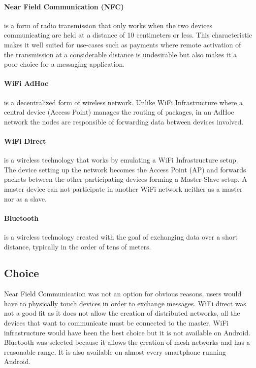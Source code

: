 \paragraph{Near Field Communication (NFC)}
is a form of radio transmission that only works when the two devices communicating are held at a distance of 10 centimeters or less. 
This characteristic makes it well suited for use-cases such as payments where remote activation of the transmission at a considerable distance is undesirable but also makes it a poor choice for a messaging application.

\paragraph{WiFi AdHoc} 
is a decentralized form of wireless network. Unlike WiFi Infrastructure where a central device (Access Point) manages the routing of packages, in an AdHoc network the nodes are responsible of forwarding data between devices involved.

\paragraph{WiFi Direct}
is a wireless technology that works by emulating a WiFi Infrastructure setup. The device setting up the network becomes the Access Point (AP) and forwards packets between the other participating devices forming a Master-Slave setup.
A master device can not participate in another WiFi network neither as a master nor as a slave.

\paragraph{Bluetooth}
is a wireless technology created with the goal of exchanging data over a short distance, typically in the order of tens of meters.

\subsection{Choice}
Near Field Communication was not an option for obvious reasons, users would have to physically touch devices in order to exchange messages.
WiFi direct was not a good fit as it does not allow the creation of distributed networks, all the devices that want to communicate must be connected to the master.
WiFi infrastructure would have been the best choice but it is not available on Android.
Bluetooth was selected because it allows the creation of mesh networks and has a reasonable range. It is also available on almost every smartphone running Android.